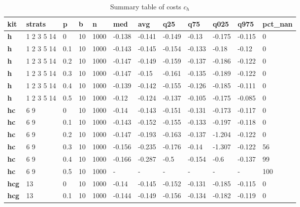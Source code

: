 \begin{longtable}[h]{|p{0.8cm}|p{1.5cm}|p{1cm}|p{1cm}|p{1cm}|p{1cm}|p{1cm}|p{1cm}|p{1cm}|p{1cm}|p{1cm}|p{1.5cm}|}
\caption{Summary table of costs $c_h$}
\label{tab:costs_mod_h} \\
      \hline
\textbf{ kit} & \textbf{ strats} & \textbf{ p} & \textbf{ b} & \textbf{ n} & \textbf{ med} & \textbf{ avg} & \textbf{ q25} & \textbf{ q75} & \textbf{ q025} & \textbf{ q975} & \textbf{ pct\_nan}
    \\ \hline
  \textbf{h   } &  1 2 3 5 14 &   0 & 10 & 1000 & -0.138 & -0.141 & -0.149 &  -0.13 & -0.175 & -0.115 &   0
    \\ \hline
  \textbf{h   } &  1 2 3 5 14 & 0.1 & 10 & 1000 & -0.143 & -0.145 & -0.154 & -0.133 &  -0.18 &  -0.12 &   0
    \\ \hline
  \textbf{h   } &  1 2 3 5 14 & 0.2 & 10 & 1000 & -0.147 & -0.149 & -0.159 & -0.137 & -0.186 & -0.122 &   0
    \\ \hline
  \textbf{h   } &  1 2 3 5 14 & 0.3 & 10 & 1000 & -0.147 &  -0.15 & -0.161 & -0.135 & -0.189 & -0.122 &   0
    \\ \hline
  \textbf{h   } &  1 2 3 5 14 & 0.4 & 10 & 1000 & -0.139 & -0.142 & -0.155 & -0.126 & -0.185 & -0.111 &   0
    \\ \hline
  \textbf{h   } &  1 2 3 5 14 & 0.5 & 10 & 1000 &  -0.12 & -0.124 & -0.137 & -0.105 & -0.175 & -0.085 &   0
    \\ \hline
  \textbf{hc  } &  6 9        &   0 & 10 & 1000 &  -0.14 & -0.143 & -0.151 & -0.131 & -0.173 & -0.117 &   0
    \\ \hline
  \textbf{hc  } &  6 9        & 0.1 & 10 & 1000 & -0.143 & -0.152 & -0.155 & -0.133 & -0.197 & -0.118 &   0
    \\ \hline
  \textbf{hc  } &  6 9        & 0.2 & 10 & 1000 & -0.147 & -0.193 & -0.163 & -0.137 & -1.204 & -0.122 &   0
    \\ \hline
  \textbf{hc  } &  6 9        & 0.3 & 10 & 1000 & -0.156 & -0.235 & -0.176 &  -0.14 & -1.307 & -0.122 &  56
    \\ \hline
  \textbf{hc  } &  6 9        & 0.4 & 10 & 1000 & -0.166 & -0.287 &   -0.5 & -0.154 &   -0.6 & -0.137 &  99
    \\ \hline
  \textbf{hc  } &  6 9        & 0.5 & 10 & 1000 & - & - & - & - & - & - & 100
    \\ \hline
  \textbf{hcg } &  13         &   0 & 10 & 1000 &  -0.14 & -0.145 & -0.152 & -0.131 & -0.185 & -0.115 &   0
    \\ \hline
  \textbf{hcg } &  13         & 0.1 & 10 & 1000 & -0.144 & -0.149 & -0.156 & -0.134 & -0.182 & -0.119 &   0

\end{longtable}
